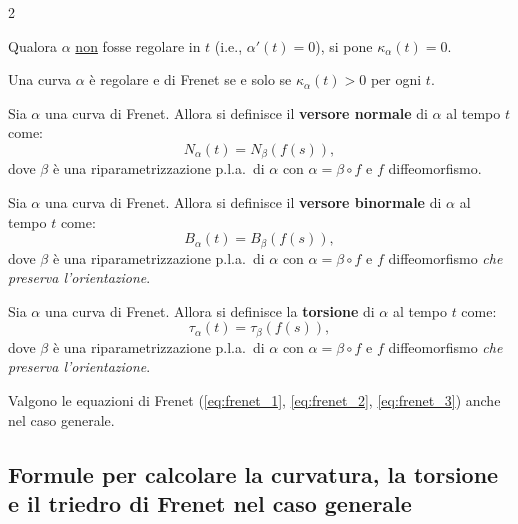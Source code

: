\begin{multicols*}{2}
\begin{definition}[Curvatura]
        Qualora $\alpha$ \underline{non} fosse regolare in $t$
        (i.e., $\alpha'(t) = 0$), si pone $\kappa_\alpha(t) = 0$.
    \end{definition}

    \begin{proposition}
        Una curva $\alpha$ è regolare e di Frenet se e solo se
        $\kappa_\alpha(t) > 0$ per ogni $t$.
    \end{proposition}

    \begin{definition}
        Sia $\alpha$ una curva di Frenet. Allora si definisce
        il \textbf{versore normale} di $\alpha$ al tempo $t$ come:
        \[
            N_\alpha(t) = N_\beta(f(s)),
        \]
        dove $\beta$ è una riparametrizzazione p.l.a.~di $\alpha$ con
        $\alpha = \beta \circ f$ e $f$ diffeomorfismo.
    \end{definition}

    \begin{definition}
        Sia $\alpha$ una curva di Frenet. Allora si definisce
        il \textbf{versore binormale} di $\alpha$ al tempo $t$ come:
        \[
            B_\alpha(t) = B_\beta(f(s)),
        \]
        dove $\beta$ è una riparametrizzazione p.l.a.~di $\alpha$ con
        $\alpha = \beta \circ f$ e $f$ diffeomorfismo \textit{che preserva
            l'orientazione}.
    \end{definition}

    \begin{definition}[Torsione]
        Sia $\alpha$ una curva di Frenet. Allora si definisce
        la \textbf{torsione} di $\alpha$ al tempo $t$ come:
        \[
            \tau_\alpha(t) = \tau_\beta(f(s)),
        \]
        dove $\beta$ è una riparametrizzazione p.l.a.~di $\alpha$ con
        $\alpha = \beta \circ f$ e $f$ diffeomorfismo \textit{che preserva
            l'orientazione}.
    \end{definition}

    \begin{proposition}
        Valgono le equazioni di Frenet (\ref{eq:frenet_1}, \ref{eq:frenet_2}, \ref{eq:frenet_3})
        anche nel caso generale.
    \end{proposition}

    \subsection{Formule per calcolare la curvatura, la torsione e il triedro di Frenet nel caso generale}


\end{multicols*}
